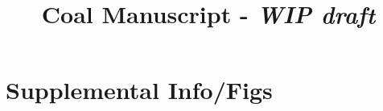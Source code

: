 \documentclass{article}
\title{Coal Manuscript - \textit{WIP draft}}
\author{}
\date{}
\begin{document}
\maketitle



% 
% 

















\section{Supplemental Info/Figs}




\end{document}
